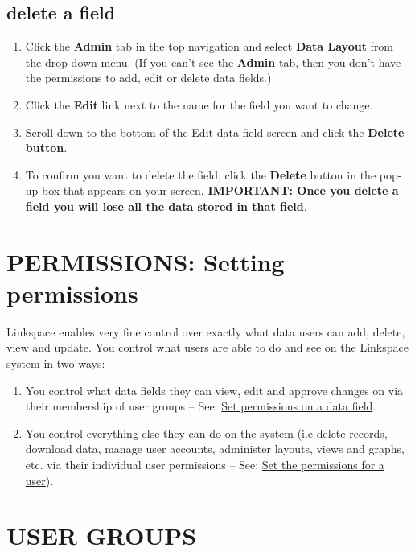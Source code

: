 \documentclass{ctrlo-int-toc}
\begin{document}
\begin{admin}
\subsection[delete a field]{delete a field}
\begin{enumerate}
\item Click the \textbf{Admin} tab in the top navigation and select \textbf{Data Layout} from the drop-down menu. (If you can't see the \textbf{Admin} tab, then you don't have the permissions to add, edit or delete data fields.)
\item Click the \textbf{Edit} link next to the name for the field you want to change.
\item Scroll down to the bottom of the Edit data field screen and click the \textbf{Delete button}.
\item To confirm you want to delete the field, click the \textbf{Delete} button in the pop-up box that appears on your screen. \textbf{IMPORTANT: Once you delete a field you will lose all the data stored in that field}. 
\end{enumerate}

\clearpage\section[PERMISSIONS: Seting permissions]{PERMISSIONS: Setting permissions}
Linkspace enables very fine control over exactly what data users can add, delete, view and update. You control what users are able to do and see on the Linkspace system in two ways:
\begin{enumerate}
    \item You control what data fields they can view, edit and approve changes on via their membership of user groups – See: \hyperref[subsec:setfieldperms]{Set permissions on a data field}.
    \item You control everything else they can do on the system (i.e delete records, download data, manage user accounts, administer layouts, views and graphs, etc. via their individual user permissions – See: \hyperref[subsec:userperms]{Set the permissions for a user}).
\end{enumerate}

\clearpage\section[USER GROUPS]{USER GROUPS}
\label{sec:usergroups}


\end{admin}
\end{document}
